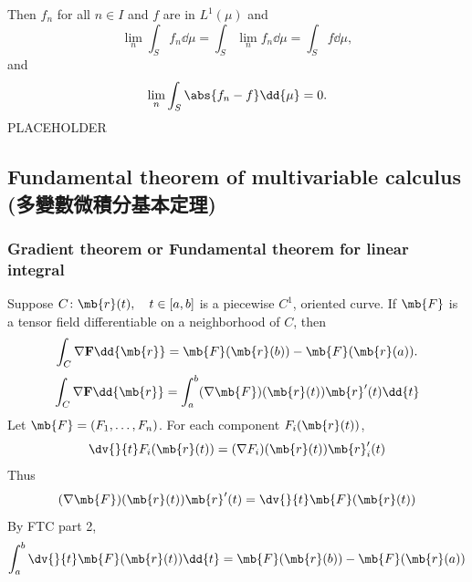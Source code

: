 Then $f_n$ for all $n\in I$ and $f$ are in $L^1(\mu)$ and
\[\lim_n\int_Sf_n\dd{\mu}=\int_S\lim_nf_n\dd{\mu}=\int_Sf\dd{\mu},\]
and
\[\lim_n\int_S\abs{f_n-f}\dd{\mu}=0.\]
\bpr
PLACEHOLDER
\epr
\subsection{Fundamental theorem of multivariable calculus (多變數微積分基本定理)}
\subsubsection{Gradient theorem or Fundamental theorem for linear integral}
Suppose $C\colon\mb{r}(t),\quad t\in[a,b]$ is a piecewise $C^1$, oriented curve. If $\mb{F}$ is a tensor field differentiable on a neighborhood of $C$, then
\[\int_C\nabla\mathbf{F}\dd{\mb{r}}=\mb{F}(\mb{r}(b))-\mb{F}(\mb{r}(a)).\]
\bpr
\[\int_C\nabla\mathbf{F}\dd{\mb{r}}=\int_a^b(\nabla\mb{F})(\mb{r}(t))\mb{r}'(t)\dd{t}\]
Let $\mb{F}=(F_1,\ldots,F_n)$. For each component $F_i(\mb{r}(t))$,
\[\dv{}{t}F_i(\mb{r}(t))=(\nabla F_i)(\mb{r}(t))\mb{r}_i'(t)\]
Thus
\[(\nabla\mb{F})(\mb{r}(t))\mb{r}'(t)=\dv{}{t}\mb{F}(\mb{r}(t))\]
By FTC part 2,
\[\int_a^b\dv{}{t}\mb{F}(\mb{r}(t))\dd{t}=\mb{F}(\mb{r}(b))-\mb{F}(\mb{r}(a))\]
\epr

